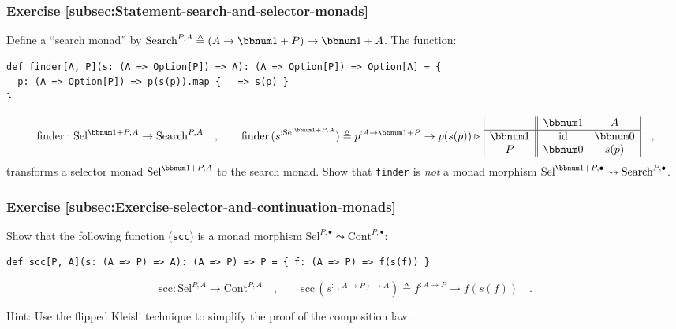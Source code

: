 \subsubsection{Exercise \label{subsec:Statement-search-and-selector-monads}\ref{subsec:Statement-search-and-selector-monads}}

Define a \textsf{``}search
monad\textsf{''} by $\text{Search}^{P,A}\triangleq\left(A\rightarrow\bbnum 1+P\right)\rightarrow\bbnum 1+A$.
The function:
\begin{lstlisting}
def finder[A, P](s: (A => Option[P]) => A): (A => Option[P]) => Option[A] = {
  p: (A => Option[P]) => p(s(p)).map { _ => s(p) }
}
\end{lstlisting}
\[
\text{finder}:\text{Sel}^{\bbnum 1+P,A}\rightarrow\text{Search}^{P,A}\quad,\quad\quad\text{finder}\,(s^{:\text{Sel}^{\bbnum 1+P,A}})\triangleq p^{:A\rightarrow\bbnum 1+P}\rightarrow p(s(p))\triangleright\,\begin{array}{|c||cc|}
 & \bbnum 1 & A\\
\hline \bbnum 1 & \text{id} & \bbnum 0\\
P & \bbnum 0 & s(p)
\end{array}\quad,
\]
transforms a selector
monad $\text{Sel}^{\bbnum 1+P,A}$ to the search monad. Show that
\lstinline!finder! is \emph{not} a monad morphism $\text{Sel}^{\bbnum 1+P,\bullet}\leadsto\text{Search}^{P,\bullet}$.

\subsubsection{Exercise \label{subsec:Exercise-selector-and-continuation-monads}\ref{subsec:Exercise-selector-and-continuation-monads}}

Show that the following function (\lstinline!scc!) is a monad morphism
$\text{Sel}^{P,\bullet}\leadsto\text{Cont}^{P,\bullet}$:
\begin{lstlisting}
def scc[P, A](s: (A => P) => A): (A => P) => P = { f: (A => P) => f(s(f)) }
\end{lstlisting}
\[
\text{scc}:\text{Sel}^{P,A}\rightarrow\text{Cont}^{P,A}\quad,\quad\quad\text{scc}\,(s^{:(A\rightarrow P)\rightarrow A})\triangleq f^{:A\rightarrow P}\rightarrow f(s(f))\quad.
\]

Hint: Use the flipped Kleisli technique to simplify the proof of the
composition law.

